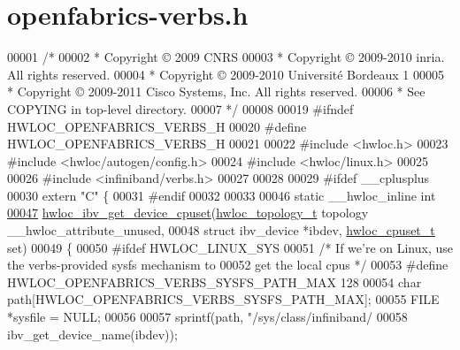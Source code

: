 \hypertarget{a00037_source}{
\section{openfabrics-\/verbs.h}
}

\begin{DoxyCode}
00001 \textcolor{comment}{/*}
00002 \textcolor{comment}{ * Copyright © 2009 CNRS}
00003 \textcolor{comment}{ * Copyright © 2009-2010 inria.  All rights reserved.}
00004 \textcolor{comment}{ * Copyright © 2009-2010 Université Bordeaux 1}
00005 \textcolor{comment}{ * Copyright © 2009-2011 Cisco Systems, Inc.  All rights reserved.}
00006 \textcolor{comment}{ * See COPYING in top-level directory.}
00007 \textcolor{comment}{ */}
00008 
00019 \textcolor{preprocessor}{#ifndef HWLOC\_OPENFABRICS\_VERBS\_H}
00020 \textcolor{preprocessor}{}\textcolor{preprocessor}{#define HWLOC\_OPENFABRICS\_VERBS\_H}
00021 \textcolor{preprocessor}{}
00022 \textcolor{preprocessor}{#include <hwloc.h>}
00023 \textcolor{preprocessor}{#include <hwloc/autogen/config.h>}
00024 \textcolor{preprocessor}{#include <hwloc/linux.h>}
00025 
00026 \textcolor{preprocessor}{#include <infiniband/verbs.h>}
00027 
00028 
00029 \textcolor{preprocessor}{#ifdef \_\_cplusplus}
00030 \textcolor{preprocessor}{}\textcolor{keyword}{extern} \textcolor{stringliteral}{"C"} \{
00031 \textcolor{preprocessor}{#endif}
00032 \textcolor{preprocessor}{}
00033 
00046 \textcolor{keyword}{static} \_\_hwloc\_inline \textcolor{keywordtype}{int}
\hypertarget{a00037_source_l00047}{}\hyperlink{a00073_gaa8ea979ce3a9b8c70ae80bc5716a0fbe}{00047} \hyperlink{a00073_gaa8ea979ce3a9b8c70ae80bc5716a0fbe}{hwloc_ibv_get_device_cpuset}(\hyperlink{a00039_ga9d1e76ee15a7dee158b786c30b6a6e38}{hwloc_topology_t} topology \_\_hwloc\_attribute\_unused,
00048                             \textcolor{keyword}{struct} ibv\_device *ibdev, \hyperlink{a00040_ga4bbf39b68b6f568fb92739e7c0ea7801}{hwloc_cpuset_t} \textcolor{keyword}{set})
00049 \{
00050 \textcolor{preprocessor}{#ifdef HWLOC\_LINUX\_SYS}
00051 \textcolor{preprocessor}{}  \textcolor{comment}{/* If we're on Linux, use the verbs-provided sysfs mechanism to}
00052 \textcolor{comment}{     get the local cpus */}
00053 \textcolor{preprocessor}{#define HWLOC\_OPENFABRICS\_VERBS\_SYSFS\_PATH\_MAX 128}
00054 \textcolor{preprocessor}{}  \textcolor{keywordtype}{char} path[HWLOC\_OPENFABRICS\_VERBS\_SYSFS\_PATH\_MAX];
00055   FILE *sysfile = NULL;
00056 
00057   sprintf(path, \textcolor{stringliteral}{"/sys/class/infiniband/%
00058           ibv\_get\_device\_name(ibdev));
}
\end{DoxyCode}
